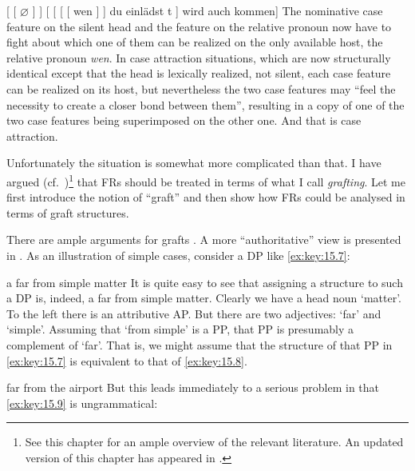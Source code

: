 \documentclass[output=paper]{langsci/langscibook}
\begin{document}
\begin{refcontext}
\ea\label{ex:key:15.6}
    {}[ [ $\varnothing$ ]\tss{\Nom{}} ]  [ [
    [ [ wen ]\tss{\Acc{}} ]  du  einlädst  t ]  wird auch kommen]
\z
The nominative case feature on the silent head and the  feature
on the relative pronoun now have to fight about which one of them can be
realized on the only available host, the relative pronoun \emph{wen}. In case
attraction situations, which are now structurally identical except that the
head is lexically realized, not silent, each case feature can be realized on
its host, but nevertheless the two case features may “feel the necessity to
create a closer bond between them”, resulting in a copy of one of the two case
features being superimposed on the other one. And that is case attraction.

Unfortunately the situation is somewhat more complicated than that. I have
argued (cf.~\cite{VanRiemsdijk2006a})\footnote{See this chapter for an ample
overview of the relevant literature. An updated version of this chapter has
appeared in \textcite{VanRiemsdijk2017}.} that \glspl{FR} should be treated in
terms of what I call \emph{grafting}. Let me first introduce the notion of
\enquote{graft} and then show how \glspl{FR} could be analysed in terms of
graft structures.

There are ample arguments for grafts \parencite[cf.][]{VanRiemsdijk2000}. A
more \enquote{authoritative} view is presented in \citet{VanRiemsdijk2006b}. As
an illustration of simple cases, consider a DP like \eqref{ex:key:15.7}:

\ea\label{ex:key:15.7}
    a far from simple matter
\z
It is quite easy to see that assigning a structure to such a DP is, indeed, a
far from simple matter. Clearly we have a head noun ‘matter’. To the left there
is an attributive AP\@. But there are two adjectives: ‘far’ and ‘simple’.
Assuming that ‘from simple’ is a PP, that PP is presumably a complement of
‘far’. That is, we might assume that the structure of that PP in \eqref{ex:key:15.7} is
equivalent to that of \eqref{ex:key:15.8}.

\ea\label{ex:key:15.8}
    far from the airport
\z
But this leads immediately to a serious problem in that \eqref{ex:key:15.9} is ungrammatical:


\end{refcontext}
\end{document}
